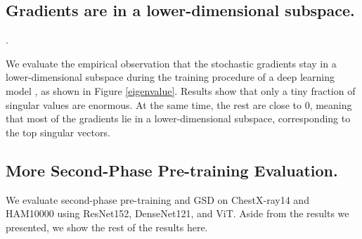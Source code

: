 \documentclass[11pt]{article}
\begin{document}
\subsection{Gradients are in a lower-dimensional subspace.} 
\begin{figure*}[!h]
    \centering
    \hfil
    \caption{Top 500 singular values in the training procedure using vanilla SGD. Model architectures are in the Appendix \ref{appexp}. Only a small fraction of singular values are extremely large while the rest are close to 0, meaning that most of the gradients lie in a lower-dimensional subspace, which corresponds to the top singular vectors.}.
    \label{eigenvalue}
\end{figure*}

We evaluate the empirical observation that the stochastic gradients stay in a lower-dimensional subspace during the training procedure of a deep learning model \cite{subspace1, subspace2}, as shown in Figure \ref{eigenvalue}. Results show that only a tiny fraction of singular values are enormous. At the same time, the rest are close to 0, meaning that most of the gradients lie in a lower-dimensional subspace, corresponding to the top singular vectors.



\subsection{More Second-Phase Pre-training Evaluation.}
We evaluate second-phase pre-training and GSD on ChestX-ray14 and HAM10000 using ResNet152, DenseNet121, and ViT. Aside from the results we presented, we show the rest of the results here.  
\end{document}
